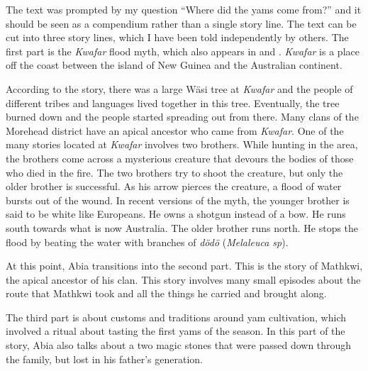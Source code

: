 The text was prompted by my question ``Where did the yams come from?'' and it should be seen as a compendium rather than a single story line. The text can be cut into three story lines, which I have been told independently by others. The first part is the \textit{Kwafar} flood myth, which also appears in \citet{Williams:1936hb} and \citet{Ayres:1983dw}. \textit{Kwafar} is a place off the coast between the island of New Guinea and the Australian continent. 

According to the story, there was a large Wäsi tree at \textit{Kwafar} and the people of different tribes and languages lived together in this tree. Eventually, the tree burned down and the people started spreading out from there. Many clans of the Morehead district have an apical ancestor who came from \textit{Kwafar}. One of the many stories located at \textit{Kwafar} involves two brothers. While hunting in the area, the brothers come across a mysterious creature that devours the bodies of those who died in the fire. The two brothers try to shoot the creature, but only the older brother is successful. As his arrow pierces the creature, a flood of water bursts out of the wound. In recent versions of the myth, the younger brother is said to be white like Europeans. He owns a shotgun instead of a bow. He runs south towards what is now Australia. The older brother runs north. He stops the flood by beating the water with branches of \textit{dödö} (\textit{Melaleuca sp}). 

At this point, Abia transitions into the second part. This is the story of Mathkwi, the apical ancestor of his clan. This story involves many small episodes about the route that Mathkwi took and all the things he carried and brought along.

The third part is about customs and traditions around yam cultivation, which involved a ritual about tasting the first yams of the season. In this part of the story, Abia also talks about a two magic stones that were passed down through the family, but lost in his father's generation.